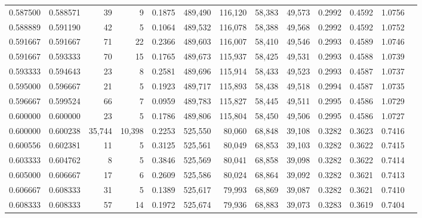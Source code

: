 \begin{tabular}{rrrrrrrrrrrrr}
0.587500 & 0.588571 &     39 &      9 &                                     0.1875 & 489,490 & 116,120 &  58,383 &  49,573 & 0.2992 & 0.4592 & 1.0756 \\
0.588889 & 0.591190 &     42 &      5 &                                     0.1064 & 489,532 & 116,078 &  58,388 &  49,568 & 0.2992 & 0.4592 & 1.0752 \\
0.591667 & 0.591667 &     71 &     22 &                                     0.2366 & 489,603 & 116,007 &  58,410 &  49,546 & 0.2993 & 0.4589 & 1.0746 \\
0.591667 & 0.593333 &     70 &     15 &                                     0.1765 & 489,673 & 115,937 &  58,425 &  49,531 & 0.2993 & 0.4588 & 1.0739 \\
0.593333 & 0.594643 &     23 &      8 &                                     0.2581 & 489,696 & 115,914 &  58,433 &  49,523 & 0.2993 & 0.4587 & 1.0737 \\
0.595000 & 0.596667 &     21 &      5 &                                     0.1923 & 489,717 & 115,893 &  58,438 &  49,518 & 0.2994 & 0.4587 & 1.0735 \\
0.596667 & 0.599524 &     66 &      7 &                                     0.0959 & 489,783 & 115,827 &  58,445 &  49,511 & 0.2995 & 0.4586 & 1.0729 \\
0.600000 & 0.600000 &     23 &      5 &                                     0.1786 & 489,806 & 115,804 &  58,450 &  49,506 & 0.2995 & 0.4586 & 1.0727 \\
0.600000 & 0.600238 & 35,744 & 10,398 &                                     0.2253 & 525,550 &  80,060 &  68,848 &  39,108 & 0.3282 & 0.3623 & 0.7416 \\
0.600556 & 0.602381 &     11 &      5 &                                     0.3125 & 525,561 &  80,049 &  68,853 &  39,103 & 0.3282 & 0.3622 & 0.7415 \\
0.603333 & 0.604762 &      8 &      5 &                                     0.3846 & 525,569 &  80,041 &  68,858 &  39,098 & 0.3282 & 0.3622 & 0.7414 \\
0.605000 & 0.606667 &     17 &      6 &                                     0.2609 & 525,586 &  80,024 &  68,864 &  39,092 & 0.3282 & 0.3621 & 0.7413 \\
0.606667 & 0.608333 &     31 &      5 &                                     0.1389 & 525,617 &  79,993 &  68,869 &  39,087 & 0.3282 & 0.3621 & 0.7410 \\
0.608333 & 0.608333 &     57 &     14 &                                     0.1972 & 525,674 &  79,936 &  68,883 &  39,073 & 0.3283 & 0.3619 & 0.7404 \\

\end{tabular}
